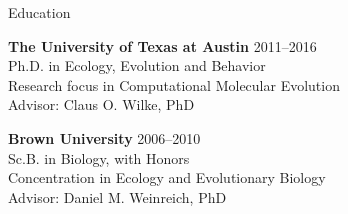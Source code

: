 \documentclass{resume} %
\begin{document}

\vspace*{0.35cm}
\begin{rSection}{Education}
\vspace*{0.25cm}

{\bf The University of Texas at Austin} \hfill {2011--2016} \\
Ph.D. in Ecology, Evolution and Behavior \\
Research focus in Computational Molecular Evolution \\
Advisor: Claus O. Wilke, PhD \\

\smallskip

{\bf Brown University} \hfill {2006--2010} \\
Sc.B. in Biology, with Honors \\
Concentration in Ecology and Evolutionary Biology \\
Advisor: Daniel M. Weinreich, PhD \\

\end{rSection}
\end{document}
